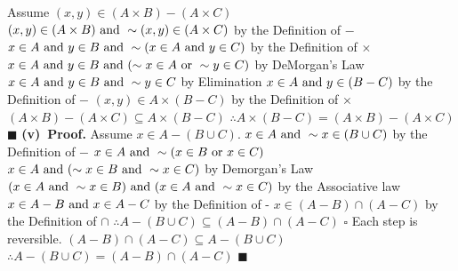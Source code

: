 \documentclass[12pt]{article}
\begin{document}
	Assume \((x,y) \in (A \times B) - (A \times C)\)
	\newline
	\((x,y) \in (A \times B) \textup{ and } \sim (x,y) \in (A \times C)\) by the Definition of \(-\)
	\newline
	\(x \in A \textup{ and } y \in B \textup{ and } \sim(x \in A \textup{ and } y \in C)\) by the Definition of \(\times\)
	\newline
	\(x \in A \textup{ and } y \in B \textup{ and } (\sim x \in A \textup{ or } \sim y \in C)\) by DeMorgan's Law
	\newline
	\(x \in A \textup{ and } y \in B \textup{ and } \sim y \in C\) by Elimination
	\newline
	\(x \in A \textup{ and } y \in (B - C)\) by the Definition of \(-\)
	\newline
	\((x,y) \in A \times (B - C)\) by the Definition of \(\times\)
	\newline
	\((A \times B) - (A \times C) \subseteq A \times (B - C) \)
	\newline
	\(\therefore A \times (B - C) = (A \times B) - (A \times C)\)
	\newline \(\blacksquare\) \newline \newline
	\textbf{(v)\ Proof.}
	Assume \(x \in A - (B \cup C)\).
	\newline
	\(x \in A \textup{ and } \sim x \in (B \cup C)\) by the Definition of \(-\)
	\newline
	\(x \in A \textup{ and } \sim (x \in B \textup{ or } x \in C)\)
	\newline
	\(x \in A \textup{ and } (\sim x \in B \textup{ and } \sim x \in C)\) by Demorgan's Law
	\newline
	\((x \in A \textup{ and } \sim x \in B) \textup{ and } (x \in A \textup{ and } \sim x \in C)\) by the Associative law
	\newline
	\(x \in A - B \textup{ and } x \in A - C\) by the Definition of -
	\newline
	\(x \in (A - B) \cap (A - C)\) by the Definition of \(\cap\)
	\newline
	\(\therefore A - (B \cup C) \subseteq (A - B) \cap (A - C)\)
	\newline \(\square\) \newline
	Each step is reversible.
	\newline
	\((A - B) \cap (A - C) \subseteq A - (B \cup C)\)
	\newline
	\(\therefore A - (B \cup C) = (A - B) \cap (A - C)\)
	\newline \(\blacksquare\)
\end{document}
